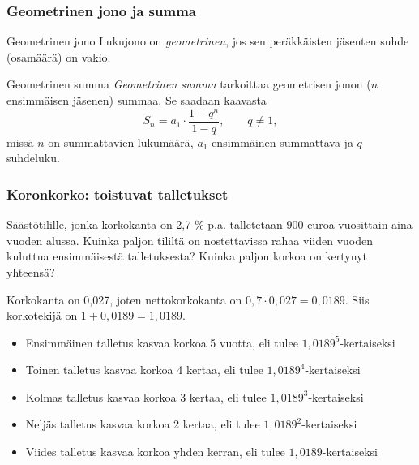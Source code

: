 \documentclass[]{beamer}
\begin{document}
\begin{frame}
    \frametitle{Geometrinen jono ja summa}
    \pause
    \begin{block}{Geometrinen jono}
        Lukujono on \emph{geometrinen}, jos sen peräkkäisten jäsenten suhde (osamäärä) on vakio.
    \end{block}
    \pause
    \begin{block}{Geometrinen summa}
        \emph{Geometrinen summa} tarkoittaa geometrisen jonon ($n$ ensimmäisen jäsenen) summaa. Se saadaan kaavasta
        \[
            S_n = a_1\cdot \frac{1-q^n}{1-q}, \qquad q\neq 1,
        \] \pause
        missä \(n\) on summattavien lukumäärä,
        \pause \(a_1\) ensimmäinen summattava
        \pause ja \(q\) suhdeluku.
    \end{block}
\end{frame}

\begin{frame}
\frametitle{Koronkorko: toistuvat talletukset}
	\begin{esim}
		Säästötilille, jonka korkokanta on 2,7 \% p.a. talletetaan 900 euroa vuosittain aina vuoden alussa.
		Kuinka paljon tililtä on nostettavissa rahaa viiden vuoden kuluttua ensimmäisestä talletuksesta?
		Kuinka paljon korkoa on kertynyt yhteensä?
	\end{esim}
\end{frame}

\begin{frame}
	\begin{ratkaisu}
		\pause 
    Korkokanta on 0,027, joten nettokorkokanta on \(0,7\cdot0,027 = 0,0189\). \pause
		Siis korkotekijä on \(1+0,0189 =	1,0189\). \pause
		\begin{itemize}
		    \item Ensimmäinen talletus kasvaa korkoa 5 vuotta, eli tulee \(1,0189^5\)-kertaiseksi\pause
		    \item Toinen talletus kasvaa korkoa 4 kertaa, eli tulee \(1,0189^4\)-kertaiseksi\pause
		    \item Kolmas talletus kasvaa korkoa 3 kertaa, eli tulee \(1,0189^3\)-kertaiseksi\pause
		    \item Neljäs talletus kasvaa korkoa 2 kertaa, eli tulee \(1,0189^2\)-kertaiseksi\pause
		    \item Viides talletus kasvaa korkoa yhden kerran, eli tulee \(1,0189\)-kertaiseksi
		\end{itemize}
	\end{ratkaisu}
\end{frame}
\end{document}

